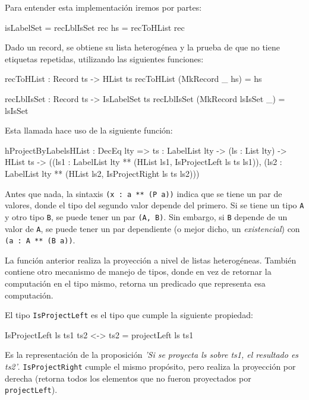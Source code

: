 Para entender esta implementación iremos por partes:

\begin{code}
isLabelSet = recLblIsSet rec
hs = recToHList rec
\end{code}

Dado un record, se obtiene su lista heterogénea y la prueba de que no tiene etiquetas repetidas, utilizando las siguientes funciones:

\begin{code}
recToHList : Record ts -> HList ts
recToHList (MkRecord _ hs) = hs

recLblIsSet : Record ts -> IsLabelSet ts
recLblIsSet (MkRecord lsIsSet _) = lsIsSet
\end{code}


Esta llamada hace uso de la siguiente función:

\begin{code}
hProjectByLabelsHList : DecEq lty => {ts : LabelList lty} ->
  (ls : List lty) -> HList ts ->
  ((ls1 : LabelList lty ** (HList ls1, IsProjectLeft ls ts ls1)),
  (ls2 : LabelList lty ** (HList ls2, IsProjectRight ls ts ls2)))
\end{code}

Antes que nada, la sintaxis \texttt{(x : a ** (P a))} indica que se tiene un par de valores, donde el tipo del segundo valor depende del primero. Si se tiene un tipo \texttt{A} y otro tipo \texttt{B}, se puede tener un par \texttt{(A, B)}. Sin embargo, si \texttt{B} depende de un valor de \texttt{A}, se puede tener un par dependiente (o mejor dicho, un \textit{existencial}) con \texttt{(a : A ** (B a))}.

La función anterior realiza la proyección a nivel de listas heterogéneas. También contiene otro mecanismo de manejo de tipos, donde en vez de retornar la computación en el tipo mismo, retorna un predicado que representa esa computación.

El tipo \texttt{IsProjectLeft} es el tipo que cumple la siguiente propiedad:

\begin{code}
IsProjectLeft ls ts1 ts2 <-> ts2 = projectLeft ls ts1
\end{code}

Es la representación de la proposición \textit{'Si se proyecta ls sobre ts1, el resultado es ts2'}. \texttt{IsProjectRight} cumple el mismo propósito, pero realiza la proyección por derecha (retorna todos los elementos que no fueron proyectados por \texttt{projectLeft}).

